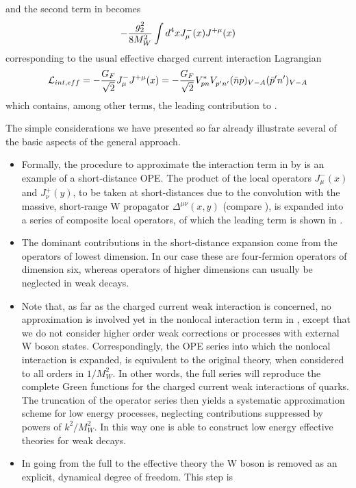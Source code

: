 and the second term in  becomes
\begin{equation}\label{jjx}
-{g^2_2\over 8M^2_W}\int d^4x J^-_\mu(x) J^{+\mu}(x)  \end{equation}
corresponding to the usual effective charged current interaction
Lagrangian
\begin{equation}\label{leff}
{\cal L}_{int,eff}=-{G_F\over\sqrt{2}} J^-_\mu J^{+\mu}(x)=-
{G_F\over\sqrt{2}}V^*_{pn}V_{p'n'}^{}(\bar np)_{V-A}
  (\bar p'n')_{V-A}
\end{equation}
which contains, among other terms, the leading contribution to
.

The simple considerations we have presented so far already illustrate
several of the basic aspects of the general approach.
\begin{itemize}
\item Formally, the procedure to approximate the interaction term in
 by  is an example of a short-distance OPE. The product
of the local operators $J^-_\mu(x)$ and $J^+_\nu(y)$, to be taken at
short-distances due to the convolution with the massive, short-range
W propagator $\Delta^{\mu\nu}(x, y)$ (compare ), is expanded
into a series of composite local operators, of which the leading term
is shown in .
\item The dominant contributions in the short-distance expansion come
from the operators of lowest dimension. In our case these are
four-fermion operators of dimension six, whereas operators of higher
dimensions can usually be neglected in weak decays.
\item Note that, as far as the charged current weak interaction is
concerned, no approximation is involved yet in the nonlocal interaction
term in , except that we do not consider higher order weak
corrections or processes with external W boson states. Correspondingly,
the OPE series into which the nonlocal interaction is expanded, is
equivalent to the original theory, when considered to all orders in
$1/M^2_W$. In other words, the full series will reproduce the complete
Green functions for the charged current weak interactions of quarks.
The truncation of the operator series then yields a systematic
approximation scheme for low energy processes, neglecting contributions
suppressed by powers of $k^2/M^2_W$. In this way one is able to
construct low energy effective theories for weak decays.
\item In going from the full to the effective theory the W boson is
removed as an explicit, dynamical degree of freedom. This step is

\end{itemize}
